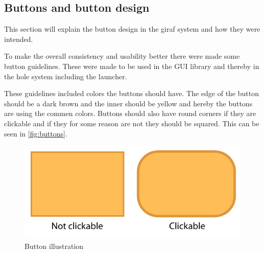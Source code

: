 \subsection{Buttons and button design}
\label{GUI:buttons}
This section will explain the button design in the giraf system and how they were intended.

To make the overall consistency and usability better there were made some button guidelines. These were made to be used in the \giraf[] GUI library and thereby in the hole \giraf[] system including the launcher.

These guidelines included colors the buttons should have. The edge of the button should be a dark brown and the inner should be yellow and hereby the buttons are using the commen \giraf[] colors. Buttons should also have round corners if they are clickable and if they for some reason are not they should be squared. This can be seen in \autoref{fig:buttons}.

\begin{figure}[h!]
	\centering
	\includegraphics[scale=0.6]{gfx/buttons.pdf}
	\caption{Button illustration}
	\label{fig:buttons}
\end{figure}


